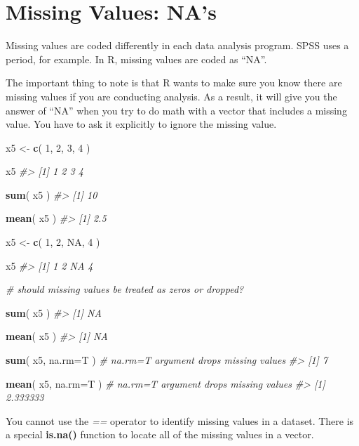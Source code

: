 \documentclass[]{book}
\newenvironment{Shaded}{\begin{snugshade}}{\end{snugshade}}
\newcommand{\CommentTok}[1]{\textcolor[rgb]{0.56,0.35,0.01}{\textit{#1}}}
\newcommand{\DataTypeTok}[1]{\textcolor[rgb]{0.13,0.29,0.53}{#1}}
\newcommand{\DecValTok}[1]{\textcolor[rgb]{0.00,0.00,0.81}{#1}}
\newcommand{\KeywordTok}[1]{\textcolor[rgb]{0.13,0.29,0.53}{\textbf{#1}}}
\newcommand{\NormalTok}[1]{#1}
\newcommand{\OtherTok}[1]{\textcolor[rgb]{0.56,0.35,0.01}{#1}}
\newcommand{\StringTok}[1]{\textcolor[rgb]{0.31,0.60,0.02}{#1}}
\theoremstyle{definition}
\theoremstyle{definition}
\theoremstyle{definition}
\theoremstyle{remark}
\begin{document}
\hypertarget{missing-values-nas}{%
\section{Missing Values: NA's}\label{missing-values-nas}}

Missing values are coded differently in each data analysis program. SPSS
uses a period, for example. In R, missing values are coded as ``NA''.

The important thing to note is that R wants to make sure you know there
are missing values if you are conducting analysis. As a result, it will
give you the answer of ``NA'' when you try to do math with a vector that
includes a missing value. You have to ask it explicitly to ignore the
missing value.

\begin{Shaded}
\begin{Highlighting}[]
\NormalTok{x5 <-}\StringTok{ }\KeywordTok{c}\NormalTok{( }\DecValTok{1}\NormalTok{, }\DecValTok{2}\NormalTok{, }\DecValTok{3}\NormalTok{, }\DecValTok{4}\NormalTok{ )}

\NormalTok{x5}
\CommentTok{#> [1] 1 2 3 4}

\KeywordTok{sum}\NormalTok{( x5 )}
\CommentTok{#> [1] 10}

\KeywordTok{mean}\NormalTok{( x5 )}
\CommentTok{#> [1] 2.5}

\NormalTok{x5 <-}\StringTok{ }\KeywordTok{c}\NormalTok{( }\DecValTok{1}\NormalTok{, }\DecValTok{2}\NormalTok{, }\OtherTok{NA}\NormalTok{, }\DecValTok{4}\NormalTok{ )}

\NormalTok{x5}
\CommentTok{#> [1]  1  2 NA  4}

\CommentTok{# should missing values be treated as zeros or dropped? }

\KeywordTok{sum}\NormalTok{( x5 )}
\CommentTok{#> [1] NA}

\KeywordTok{mean}\NormalTok{( x5 )}
\CommentTok{#> [1] NA}

\KeywordTok{sum}\NormalTok{( x5, }\DataTypeTok{na.rm=}\NormalTok{T )   }\CommentTok{# na.rm=T argument drops missing values}
\CommentTok{#> [1] 7}

\KeywordTok{mean}\NormalTok{( x5, }\DataTypeTok{na.rm=}\NormalTok{T )  }\CommentTok{# na.rm=T argument drops missing values}
\CommentTok{#> [1] 2.333333}
\end{Highlighting}
\end{Shaded}

You cannot use the \emph{==} operator to identify missing values in a
dataset. There is a special \textbf{is.na()} function to locate all of
the missing values in a vector.
\end{document}
